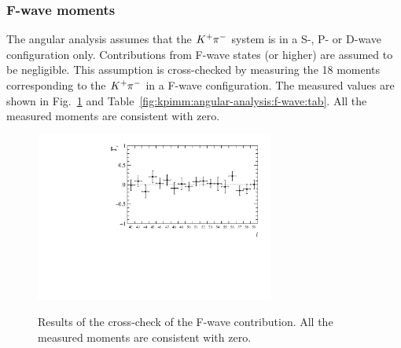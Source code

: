 
\subsubsection{F-wave moments}

The angular analysis assumes that the ${{K}^+}{{\pi}^-}$ system is in a S-, P- or D-wave configuration only. Contributions from F-wave states (or higher) are assumed to be negligible. This assumption is cross-checked by measuring the 18 moments corresponding to the ${{K}^+}{{\pi}^-}$ in a F-wave configuration. The measured values are shown in Fig.~\ref{fig:kpimm:angular-analysis:f-wave:fig} and Table~\ref{fig:kpimm:angular-analysis:f-wave:tab}. All the measured moments are consistent with zero.

\begin{figure}[!htb]
\caption{Results of the cross-check of the F-wave contribution. All the measured moments are consistent with zero.}
\centering
\includegraphics[width=0.7\textwidth]{figs/kpimm/angular-analysis/f-wave-moments.pdf}
\label{fig:kpimm:angular-analysis:f-wave:fig}
\end{figure}

